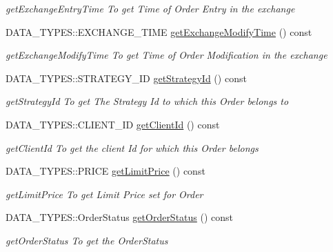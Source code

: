 \begin{DoxyCompactItemize}
\begin{DoxyCompactList}\small\item\em get\-Exchange\-Entry\-Time To get Time of Order Entry in the exchange \end{DoxyCompactList}\item 
D\-A\-T\-A\-\_\-\-T\-Y\-P\-E\-S\-::\-E\-X\-C\-H\-A\-N\-G\-E\-\_\-\-T\-I\-M\-E \hyperlink{class_a_p_i2_1_1_order_confirmation_a9b3ecf482b70d0c11f6d4fc05363668e}{get\-Exchange\-Modify\-Time} () const 
\begin{DoxyCompactList}\small\item\em get\-Exchange\-Modify\-Time To get Time of Order Modification in the exchange \end{DoxyCompactList}\item 
D\-A\-T\-A\-\_\-\-T\-Y\-P\-E\-S\-::\-S\-T\-R\-A\-T\-E\-G\-Y\-\_\-\-I\-D \hyperlink{class_a_p_i2_1_1_order_confirmation_ac3be746c6becde4ddfeab316a41120d0}{get\-Strategy\-Id} () const 
\begin{DoxyCompactList}\small\item\em get\-Strategy\-Id To get The Strategy Id to which this Order belongs to \end{DoxyCompactList}\item 
D\-A\-T\-A\-\_\-\-T\-Y\-P\-E\-S\-::\-C\-L\-I\-E\-N\-T\-\_\-\-I\-D \hyperlink{class_a_p_i2_1_1_order_confirmation_adc0c80bcf4d99437b26e482143dc4b45}{get\-Client\-Id} () const 
\begin{DoxyCompactList}\small\item\em get\-Client\-Id To get the client Id for which this Order belongs \end{DoxyCompactList}\item 
D\-A\-T\-A\-\_\-\-T\-Y\-P\-E\-S\-::\-P\-R\-I\-C\-E \hyperlink{class_a_p_i2_1_1_order_confirmation_a7452a5686513c6ee0805716f13247e9c}{get\-Limit\-Price} () const 
\begin{DoxyCompactList}\small\item\em get\-Limit\-Price To get Limit Price set for Order \end{DoxyCompactList}\item 
D\-A\-T\-A\-\_\-\-T\-Y\-P\-E\-S\-::\-Order\-Status \hyperlink{class_a_p_i2_1_1_order_confirmation_a5d6785788ff0b6417297b2afc185b3c9}{get\-Order\-Status} () const 
\begin{DoxyCompactList}\small\item\em get\-Order\-Status To get the Order\-Status \end{DoxyCompactList}\item 

\end{DoxyCompactItemize}
